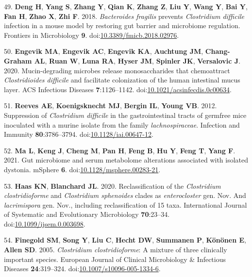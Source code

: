 \documentclass[
  12pt,
]{article}
\newenvironment{cslreferences}%
  {}%
  {\par}
\begin{document}
\begin{cslreferences}
\leavevmode\hypertarget{ref-Deng2018}{}%
49. \textbf{Deng H}, \textbf{Yang S}, \textbf{Zhang Y}, \textbf{Qian K},
\textbf{Zhang Z}, \textbf{Liu Y}, \textbf{Wang Y}, \textbf{Bai Y},
\textbf{Fan H}, \textbf{Zhao X}, \textbf{Zhi F}. 2018. \emph{Bacteroides
fragilis} prevents \emph{Clostridium difficile} infection in a mouse
model by restoring gut barrier and microbiome regulation. Frontiers in
Microbiology \textbf{9}.
doi:\href{https://doi.org/10.3389/fmicb.2018.02976}{10.3389/fmicb.2018.02976}.

\leavevmode\hypertarget{ref-Engevik2020}{}%
50. \textbf{Engevik MA}, \textbf{Engevik AC}, \textbf{Engevik KA},
\textbf{Auchtung JM}, \textbf{Chang-Graham AL}, \textbf{Ruan W},
\textbf{Luna RA}, \textbf{Hyser JM}, \textbf{Spinler JK},
\textbf{Versalovic J}. 2020. Mucin-degrading microbes release
monosaccharides that chemoattract \emph{Clostridioides difficile} and
facilitate colonization of the human intestinal mucus layer. ACS
Infectious Diseases \textbf{7}:1126--1142.
doi:\href{https://doi.org/10.1021/acsinfecdis.0c00634}{10.1021/acsinfecdis.0c00634}.

\leavevmode\hypertarget{ref-Reeves2012}{}%
51. \textbf{Reeves AE}, \textbf{Koenigsknecht MJ}, \textbf{Bergin IL},
\textbf{Young VB}. 2012. Suppression of \emph{Clostridium difficile} in
the gastrointestinal tracts of germfree mice inoculated with a murine
isolate from the family \emph{lachnospiraceae}. Infection and Immunity
\textbf{80}:3786--3794.
doi:\href{https://doi.org/10.1128/iai.00647-12}{10.1128/iai.00647-12}.

\leavevmode\hypertarget{ref-Ma2021}{}%
52. \textbf{Ma L}, \textbf{Keng J}, \textbf{Cheng M}, \textbf{Pan H},
\textbf{Feng B}, \textbf{Hu Y}, \textbf{Feng T}, \textbf{Yang F}. 2021.
Gut microbiome and serum metabolome alterations associated with isolated
dystonia. mSphere \textbf{6}.
doi:\href{https://doi.org/10.1128/msphere.00283-21}{10.1128/msphere.00283-21}.

\leavevmode\hypertarget{ref-Haas2020}{}%
53. \textbf{Haas KN}, \textbf{Blanchard JL}. 2020. Reclassification of
the \emph{Clostridium clostridioforme} and \emph{Clostridium sphenoides}
clades as \emph{enterocloster} gen. Nov. And \emph{lacrimispora} gen.
Nov., including reclassification of 15 taxa. International Journal of
Systematic and Evolutionary Microbiology \textbf{70}:23--34.
doi:\href{https://doi.org/10.1099/ijsem.0.003698}{10.1099/ijsem.0.003698}.

\leavevmode\hypertarget{ref-Finegold2005}{}%
54. \textbf{Finegold SM}, \textbf{Song Y}, \textbf{Liu C}, \textbf{Hecht
DW}, \textbf{Summanen P}, \textbf{Könönen E}, \textbf{Allen SD}. 2005.
\emph{Clostridium clostridioforme}: A mixture of three clinically
important species. European Journal of Clinical Microbiology \&
Infectious Diseases \textbf{24}:319--324.
doi:\href{https://doi.org/10.1007/s10096-005-1334-6}{10.1007/s10096-005-1334-6}.


\end{cslreferences}
\end{document}
